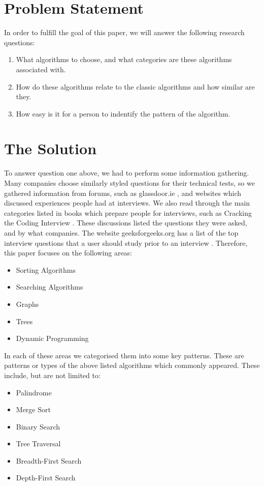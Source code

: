 \documentclass[10pt,twocolumn]{IEEEtran}
\begin{document}
\section{Problem Statement}
In order to fulfill the goal of this paper, we will answer the following research questions:
\begin{enumerate}
\item What algorithms to choose, and what categories are these algorithms associated with. 
\item How do these algorithms relate to the classic algorithms and how similar are they.
\item How easy is it for a person to indentify the pattern of the algorithm.
\end{enumerate}
\section{The Solution}
To answer question one above, we had to perform some information gathering. Many companies choose similarly styled questions for their technical tests, so we gathered information from forums, such as glassdoor.ie \cite{glassdoor}, and websites which discussed experiences people had at interviews. We also read through the main categories listed in books which prepare people for interviews, such as Cracking the Coding Interview \cite{mcdowell2015cracking}. These discussions listed the questions they were asked, and by what companies. The website geeksforgeeks.org has a list of the top interview questions that a user should study prior to an interview \cite{geeksalgos}. Therefore, this paper focuses on the following areas:
\begin{itemize}
\item Sorting Algorithms
\item Searching Algorithms
\item Graphs
\item Trees
\item Dynamic Programming
\end{itemize}
In each of these areas we categorised them into some key patterns. These are patterns or types of the above listed algorithms which commonly appeared. These include, but are not limited to:
\begin{itemize}
\item Palindrome
\item Merge Sort
\item Binary Search
\item Tree Traversal
\item Breadth-First Search
\item Depth-First Search
\label{itm:patterns}
\end{itemize} 
\end{document}

